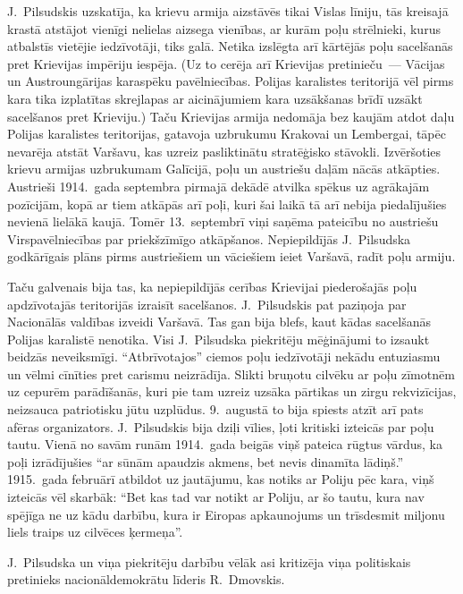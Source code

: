 \documentclass[twoside,a5paper,12pt,fleqn,openany]{extbook}
\begin{document}
J.~Pilsudskis uzskatīja, ka krievu armija aizstāvēs tikai Vislas līniju, tās kreisajā krastā atstājot vienīgi nelielas aizsega vienības, ar kurām poļu strēlnieki, kurus atbalstīs vietējie iedzīvotāji, tiks galā. Netika izslēgta arī kārtējās poļu sacelšanās pret Krievijas impēriju iespēja. (Uz to cerēja arī Krievijas pretinieču~--- Vācijas un Austroungārijas karaspēku pavēlniecības. Polijas karalistes teritorijā vēl pirms kara tika izplatītas skrejlapas ar aicinājumiem kara uzsākšanas brīdī uzsākt sacelšanos pret Krieviju.) Taču Krievijas armija nedomāja bez kaujām atdot daļu Polijas karalistes teritorijas, gatavoja uzbrukumu Krakovai un Lembergai, tāpēc nevarēja atstāt Varšavu, kas uzreiz pasliktinātu stratēģisko stāvokli. Izvēršoties krievu armijas uzbrukumam Galīcijā, poļu un austriešu daļām nācās atkāpties. Austrieši 1914.~gada septembra pirmajā dekādē atvilka spēkus uz agrākajām pozīcijām, kopā ar tiem atkāpās arī poļi, kuri šai laikā tā arī nebija piedalījušies nevienā lielākā kaujā. Tomēr 13.~septembrī viņi saņēma pateicību no austriešu Virspavēlniecības par priekšzīmīgo atkāpšanos. Nepiepildījās J.~Pilsudska godkārīgais plāns pirms austriešiem un vāciešiem ieiet Varšavā, radīt poļu armiju.

Taču galvenais bija tas, ka nepiepildījās cerības Krievijai piederošajās poļu apdzīvotajās teritorijās izraisīt sacelšanos. J.~Pilsudskis pat paziņoja par Nacionālās valdības izveidi Varšavā. Tas gan bija blefs, kaut kādas sacelšanās Polijas karalistē nenotika. Visi J.~Pilsudska piekritēju mēģinājumi to izsaukt beidzās neveiksmīgi. ``Atbrīvotajos'' ciemos poļu iedzīvotāji nekādu entuziasmu un vēlmi cīnīties pret carismu neizrādīja. Slikti bruņotu cilvēku ar poļu zīmotnēm uz cepurēm parādīšanās, kuri pie tam uzreiz uzsāka pārtikas un zirgu rekvizīcijas, neizsauca patriotisku jūtu uzplūdus. 9.~augustā to bija spiests atzīt arī pats afēras organizators. J.~Pilsudskis bija dziļi vīlies, ļoti kritiski izteicās par poļu tautu. Vienā no savām runām 1914.~gada beigās viņš pateica rūgtus vārdus, ka poļi izrādījušies ``ar sūnām apaudzis akmens, bet nevis dinamīta lādiņš.'' 1915.~gada februārī atbildot uz jautājumu, kas notiks ar Poliju pēc kara, viņš izteicās vēl skarbāk: ``Bet kas tad var notikt ar Poliju, ar šo tautu, kura nav spējīga ne uz kādu darbību, kura ir Eiropas apkaunojums un trīsdesmit miljonu liels traips uz cilvēces ķermeņa''.

J.~Pilsudska un viņa piekritēju darbību vēlāk asi kritizēja viņa politiskais pretinieks nacionāldemokrātu līderis R.~Dmovskis.
\end{document}
